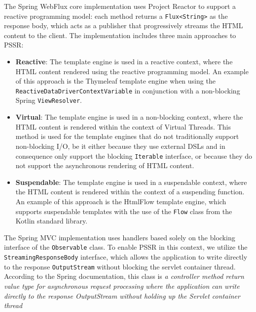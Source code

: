 The Spring WebFlux core implementation uses Project Reactor to support a
reactive programming model: each method returns a \texttt{Flux<String>} as the
response body, which acts as a publisher that progressively streams the HTML
content to the client. The implementation includes three main approaches to
PSSR\@:
\begin{itemize}
  \item \textbf{Reactive}: The template engine is used in a reactive context,
        where the HTML content rendered using the reactive programming model.
        An example of this approach is the Thymeleaf template engine
        when using the \texttt{ReactiveDataDriverContextVariable} in conjunction with a
        non-blocking Spring \texttt{ViewResolver}.
  \item \textbf{Virtual}: The template engine is used in a non-blocking
        context, where the HTML content is rendered within the context of Virtual
        Threads. This method is used for the template engines that do not traditionally
        support non-blocking I/O, be it either because they use external DSLs and in
        consequence only support the blocking \texttt{Iterable} interface, or
        because they do not support the asynchronous rendering of HTML content.
  \item \textbf{Suspendable}: The template engine is used in a suspendable
        context, where the HTML content is rendered within the context of a suspending function.
        An example of this approach is the HtmlFlow template engine, which
        supports suspendable templates with the use of the \texttt{Flow} class from the
        Kotlin standard library.
\end{itemize}
The Spring MVC implementation uses handlers based solely on the blocking
interface of the \texttt{Observable} class. To enable PSSR in this context, we
utilize the \texttt{StreamingResponseBody} interface, which allows the
application to write directly to the response \texttt{OutputStream} without
blocking the servlet container thread. According to the Spring documentation,
this class is \textit{a controller method return value type for asynchronous
  request processing where the application can write directly to the response
  OutputStream without holding up the Servlet container thread}

